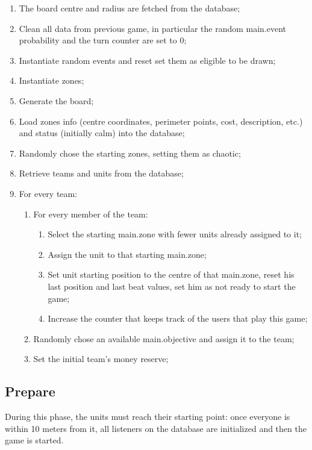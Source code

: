 			\begin{enumerate}
				\item The board centre and radius are fetched from the database;
				\item Clean all data from previous game, in particular the random main.event probability and the turn counter are set to 0;
				\item Instantiate random events and reset set them as eligible to be drawn;
				\item Instantiate zones;
				\item Generate the board;
				\item Load zones info (centre coordinates, perimeter points, cost, description, etc.) and status (initially calm) into the database;
				\item Randomly chose the starting zones, setting them as chaotic;
				\item Retrieve teams and units from the database;
				\item For every team: 
				\begin{enumerate}					
					\item For every member of the team:
					\begin{enumerate}
						\item Select the starting main.zone with fewer units already assigned to it;
						\item Assign the unit to that starting main.zone;
						\item Set unit starting position to the centre of that main.zone, reset his last position and last beat values, set him as not ready to start the game;
						\item Increase the counter that keeps track of the users that play this game;
					\end{enumerate}
					\item Randomly chose an available main.objective and assign it to the team;
					\item Set the initial team's money reserve;
				\end{enumerate}
			\end{enumerate}
		
		\subsection{Prepare}
		
			During this phase, the units must reach their starting point: once everyone is within 10 meters from it, all listeners on the database are initialized and then the game is started.
		

